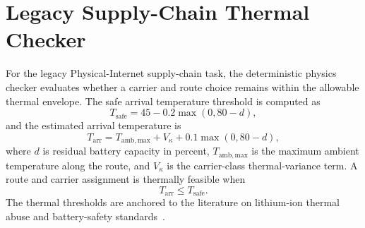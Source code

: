 \documentclass[journal]{IEEEtran}
\begin{document}
\section{Legacy Supply-Chain Thermal Checker}
\label{sec:supp-checker}

For the legacy Physical-Internet supply-chain task, the deterministic
physics checker evaluates whether a carrier and route choice remains
within the allowable thermal envelope.  The safe arrival temperature
threshold is computed as
\begin{equation}
\label{eq:t-safe}
T_{\mathrm{safe}}
=
45 - 0.2\max(0,80-d),
\end{equation}
and the estimated arrival temperature is
\begin{equation}
\label{eq:t-arr}
T_{\mathrm{arr}}
=
T_{\mathrm{amb,max}}
+
V_{\kappa}
+
0.1\max(0,80-d),
\end{equation}
where \(d\) is residual battery capacity in percent,
\(T_{\mathrm{amb,max}}\) is the maximum ambient temperature along the
route, and \(V_{\kappa}\) is the carrier-class thermal-variance term.
A route and carrier assignment is thermally feasible when
\begin{equation}
\label{eq:thermal-feasible}
T_{\mathrm{arr}} \leq T_{\mathrm{safe}}.
\end{equation}
The thermal thresholds are anchored to the literature on lithium-ion
thermal abuse and battery-safety
standards~\cite{iec62133,feng2018thermal,finegan2017characterising}.



\end{document}
